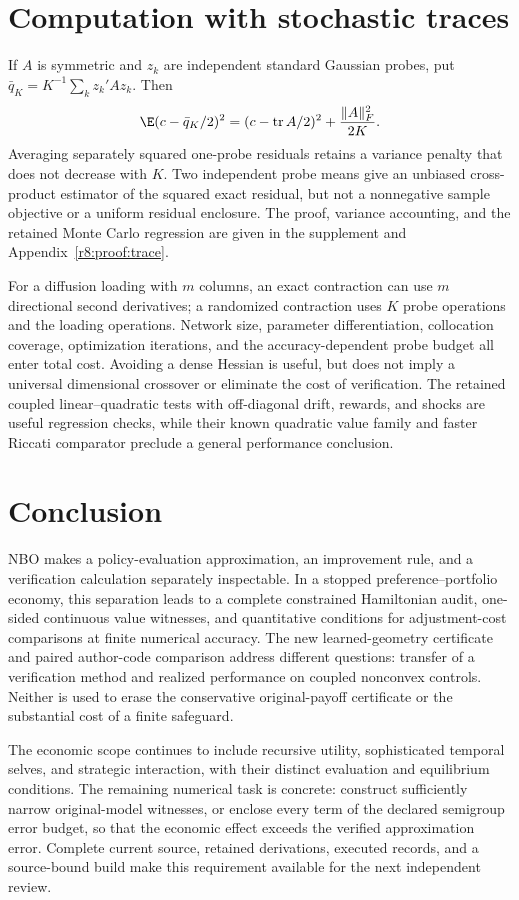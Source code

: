 \section{Computation with stochastic traces}\label{r8:traces}
If $A$ is symmetric and $z_k$ are independent standard Gaussian probes, put $\bar q_K=K^{-1}\sum_kz_k'Az_k$. Then
\begin{equation}
 \E(c-\bar q_K/2)^2=(c-\operatorname{tr}A/2)^2+\frac{\|A\|_F^2}{2K}.\label{r8:trace}
\end{equation}
Averaging separately squared one-probe residuals retains a variance penalty that does not decrease with $K$. Two independent probe means give an unbiased cross-product estimator of the squared exact residual, but not a nonnegative sample objective or a uniform residual enclosure. The proof, variance accounting, and the retained Monte Carlo regression are given in the supplement and Appendix~\ref{r8:proof:trace}.

For a diffusion loading with $m$ columns, an exact contraction can use $m$ directional second derivatives; a randomized contraction uses $K$ probe operations and the loading operations. Network size, parameter differentiation, collocation coverage, optimization iterations, and the accuracy-dependent probe budget all enter total cost. Avoiding a dense Hessian is useful, but does not imply a universal dimensional crossover or eliminate the cost of verification. The retained coupled linear--quadratic tests with off-diagonal drift, rewards, and shocks are useful regression checks, while their known quadratic value family and faster Riccati comparator preclude a general performance conclusion.

\section{Conclusion}
NBO makes a policy-evaluation approximation, an improvement rule, and a verification calculation separately inspectable. In a stopped preference--portfolio economy, this separation leads to a complete constrained Hamiltonian audit, one-sided continuous value witnesses, and quantitative conditions for adjustment-cost comparisons at finite numerical accuracy. The new learned-geometry certificate and paired author-code comparison address different questions: transfer of a verification method and realized performance on coupled nonconvex controls. Neither is used to erase the conservative original-payoff certificate or the substantial cost of a finite safeguard.

The economic scope continues to include recursive utility, sophisticated temporal selves, and strategic interaction, with their distinct evaluation and equilibrium conditions. The remaining numerical task is concrete: construct sufficiently narrow original-model witnesses, or enclose every term of the declared semigroup error budget, so that the economic effect exceeds the verified approximation error. Complete current source, retained derivations, executed records, and a source-bound build make this requirement available for the next independent review.
